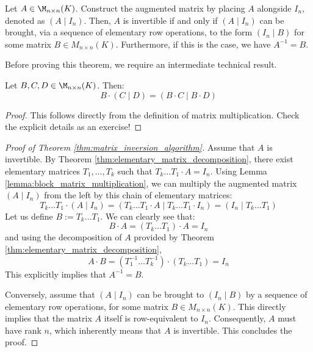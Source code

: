 \begin{theorem}
\label{thm:matrix_inversion_algorithm}
Let $A \in \M_{n \times n}(K)$. Construct the augmented matrix by placing $A$ alongside $I_n$, denoted as $(A \mid I_n)$. Then, $A$ is invertible if and only if $(A \mid I_n)$ can be brought, via a sequence of elementary row operations, to the form $(I_n \mid B)$ for some matrix $B \in M_{n \times n}(K)$. Furthermore, if this is the case, we have $A^{-1} = B$.
\end{theorem}

Before proving this theorem, we require an intermediate technical result.

\begin{lemma}
\label{lemma:block_matrix_multiplication}
Let $B, C, D \in \M_{n \times n}(K)$. Then:
\begin{equation*}
    B \cdot \left(C \mid D\right) = \left(B \cdot C \mid B \cdot D\right)
\end{equation*}
\end{lemma}

\begin{proof}
This follows directly from the definition of matrix multiplication. Check the explicit details as an exercise!
\end{proof}

\begin{proof}[Proof of Theorem \ref{thm:matrix_inversion_algorithm}]
Assume that $A$ is invertible. By Theorem \ref{thm:elementary_matrix_decomposition}, there exist elementary matrices $T_1, \dots, T_k$ such that $T_k \dots T_1 \cdot A = I_n$. Using Lemma \ref{lemma:block_matrix_multiplication}, we can multiply the augmented matrix $(A \mid I_n)$ from the left by this chain of elementary matrices:
\begin{equation*}
    T_k \dots T_1 \cdot \left(A \mid I_n\right) = \left(T_k \dots T_1 \cdot A \mid T_k \dots T_1 \cdot I_n\right) = \left(I_n \mid T_k \dots T_1\right)
\end{equation*}
Let us define $B := T_k \dots T_1$. We can clearly see that:
\begin{equation*}
    B \cdot A = (T_k \dots T_1) \cdot A = I_n
\end{equation*}
and using the decomposition of $A$ provided by Theorem \ref{thm:elementary_matrix_decomposition},
\begin{equation*}
    A \cdot B = (T_1^{-1} \dots T_k^{-1}) \cdot (T_k \dots T_1) = I_n
\end{equation*}
This explicitly implies that $A^{-1} = B$.

Conversely, assume that $(A \mid I_n)$ can be brought to $(I_n \mid B)$ by a sequence of elementary row operations, for some matrix $B \in M_{n \times n}(K)$. This directly implies that the matrix $A$ itself is row-equivalent to $I_n$. Consequently, $A$ must have rank $n$, which inherently means that $A$ is invertible. This concludes the proof.
\end{proof}

